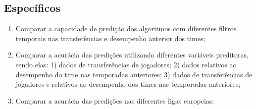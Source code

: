 \documentclass[a4paper]{article}
\theoremstyle{plain}
\theoremstyle{definition}
\begin{document}
\subsection{Específicos}
\begin{enumerate}
    \item Comparar a capacidade de predição dos algoritmos com diferentes filtros temporais nas transferências e desempenho anterior dos times;
    \item Comparar a acurácia das predições utilizando diferentes variáveis preditoras, sendo elas: 1) dados de transferências de jogadores; 2) dados relativos ao desempenho do time nas temporadas anteriores; 3) dados de transferências de jogadores e relativos ao desempenho dos times nas temporadas anteriores;
    \item Comparar a acurácia das predições nas diferentes ligas europeias;
\end{enumerate}



\end{document}
